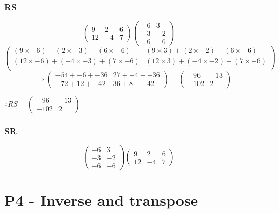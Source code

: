 \documentclass{article}
\begin{document}
\subsubsection{RS}
\[
	\begin{pmatrix}
		9 & 2 & 6\\
		12 & -4 & 7
	\end{pmatrix}
	\begin{pmatrix}
		-6 & 3\\
		-3 & -2\\
		-6 & -6
	\end{pmatrix}
	=
\]
\[
	\begin{pmatrix}
		(9\times-6)+(2\times-3)+(6\times-6) & (9\times3)+(2\times-2)+(6\times-6)\\
		(12\times-6)+(-4\times-3)+(7\times-6) & (12\times3)+(-4\times-2)+(7\times-6)\\
	\end{pmatrix}
\]
\[
	\Rightarrow
	\begin{pmatrix}
		-54+-6+-36 & 27+-4+-36\\
		-72+12+-42 & 36+8+-42
	\end{pmatrix}
	=
	\begin{pmatrix}
		-96 & -13\\
		-102 & 2
	\end{pmatrix}
\]
\begin{center}\vspace{0.5cm}$\therefore
	RS=
	\begin{pmatrix}
		-96 & -13\\
		-102 & 2
	\end{pmatrix}
$\end{center}
\subsubsection{SR}
\[
	\begin{pmatrix}
		-6 & 3\\
		-3 & -2\\
		-6 & -6
	\end{pmatrix}
	\begin{pmatrix}
		9 & 2 & 6\\
		12 & -4 & 7
	\end{pmatrix}
	=
\]
\[
\]
\section{P4 - Inverse and transpose}
\end{document}
